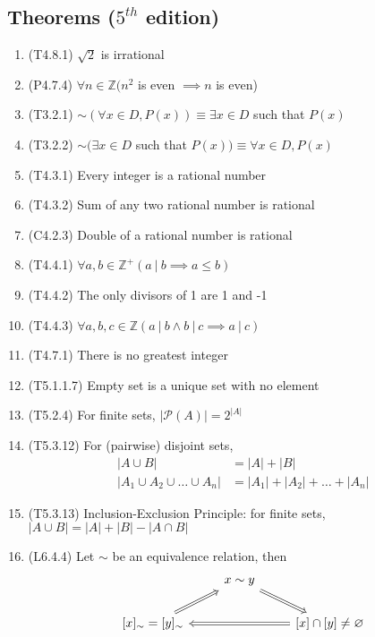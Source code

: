 \documentclass[landscape, a4paper]{article}
\newcommand{\Z}{\mathbb{Z}}
\renewcommand{\P}{\mathcal{P}}
\renewcommand{\and}{\wedge}
\newcommand{\customsection}[1]{%
    \vspace*{-16pt}%
    \section*{#1}%
    \vspace*{-5pt}%
}
\begin{document}
\begin{multicols*}{4}
    \customsection{Theorems ($5^{th}$ edition)}
    \begin{enumerate}[wide, labelindent=2pt]
        \item (T4.8.1) $\sqrt{2}$ is irrational
        \item (P4.7.4) $\forall n\in\Z (n^2$ is even $\implies n$ is even)
        \item (T3.2.1) ${\sim} (\forall x\in D, P(x)) \equiv \exists x\in D$ such that $P(x)$
        \item (T3.2.2) ${\sim} (\exists x\in D$ such that $P(x)) \equiv \forall x\in D, P(x)$
        \item (T4.3.1) Every integer is a rational number
        \item (T4.3.2) Sum of any two rational number is rational
        \item (C4.2.3) Double of a rational number is rational
        \item (T4.4.1) $\forall a,b\in\Z^+ (a\ |\ b\implies a\leq b)$
        \item (T4.4.2) The only divisors of 1 are 1 and -1
        \item (T4.4.3) $\forall a,b,c\in\Z (a\ |\ b \and b\ |\ c\implies a\ |\ c)$
        \item (T4.7.1) There is no greatest integer
        \item (T5.1.1.7) Empty set is a unique set with no element
        \item (T5.2.4) For finite sets, $|\P(A)|=2^{|A|}$
        \item (T5.3.12) For (pairwise) disjoint sets,
              \begin{align*}
                  |A\cup B|                         & =|A|+|B|                  \\
                  |A_1\cup A_2\cup \ldots \cup A_n| & =|A_1|+|A_2|+\ldots+|A_n|
              \end{align*}
        \item (T5.3.13) Inclusion-Exclusion Principle: for finite sets, $|A\cup B|=|A|+|B|-|A\cap B|$
        \item (L6.4.4) Let ${\sim}$ be an equivalence relation, then
              \[
                  \begin{tikzcd}
                      & x \sim y \arrow[dr, Rightarrow] &\\
                      {[x]_{\sim}}={[y]_{\sim}} \arrow[ur, Rightarrow] & & \arrow[ll, Rightarrow] [x]\cap[y]\neq\varnothing
                  \end{tikzcd}
\]
\end{enumerate}
\end{multicols*}
\end{document}
